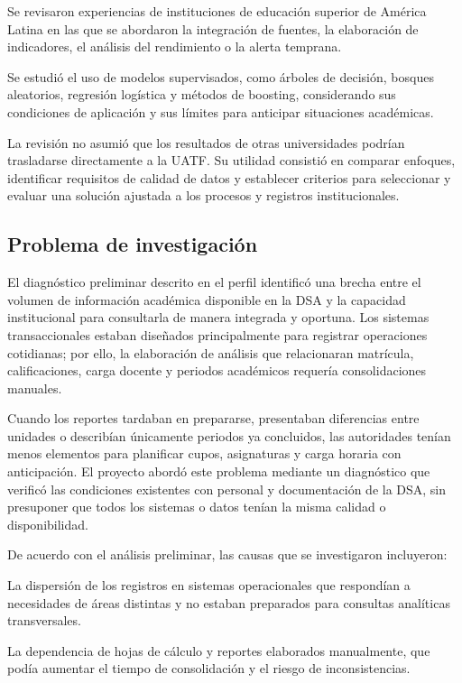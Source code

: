 \documentclass[11pt,oneside,openany]{book}
\begin{document}
Se revisaron experiencias de instituciones de educación superior de América Latina en las que se abordaron la integración de fuentes, la elaboración de indicadores, el análisis del rendimiento o la alerta temprana.

Se estudió el uso de modelos supervisados, como árboles de decisión, bosques aleatorios, regresión logística y métodos de boosting, considerando sus condiciones de aplicación y sus límites para anticipar situaciones académicas.

La revisión no asumió que los resultados de otras universidades podrían trasladarse directamente a la UATF. Su utilidad consistió en comparar enfoques, identificar requisitos de calidad de datos y establecer criterios para seleccionar y evaluar una solución ajustada a los procesos y registros institucionales.

\subsection*{Problema de investigación}

El diagnóstico preliminar descrito en el perfil identificó una brecha entre el volumen de información académica disponible en la DSA y la capacidad institucional para consultarla de manera integrada y oportuna. Los sistemas transaccionales estaban diseñados principalmente para registrar operaciones cotidianas; por ello, la elaboración de análisis que relacionaran matrícula, calificaciones, carga docente y periodos académicos requería consolidaciones manuales.

Cuando los reportes tardaban en prepararse, presentaban diferencias entre unidades o describían únicamente periodos ya concluidos, las autoridades tenían menos elementos para planificar cupos, asignaturas y carga horaria con anticipación. El proyecto abordó este problema mediante un diagnóstico que verificó las condiciones existentes con personal y documentación de la DSA, sin presuponer que todos los sistemas o datos tenían la misma calidad o disponibilidad.

De acuerdo con el análisis preliminar, las causas que se investigaron incluyeron:

La dispersión de los registros en sistemas operacionales que respondían a necesidades de áreas distintas y no estaban preparados para consultas analíticas transversales.

La dependencia de hojas de cálculo y reportes elaborados manualmente, que podía aumentar el tiempo de consolidación y el riesgo de inconsistencias.
\end{document}
